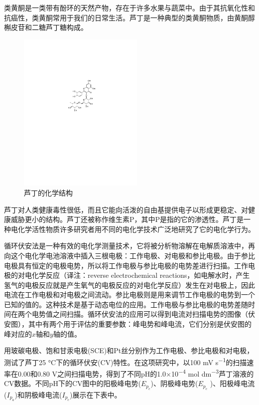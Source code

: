 类黄酮是一类带有酚环的天然产物，存在于许多水果与蔬菜中。由于其抗氧化性和抗癌性，类黄酮常用于我们的日常生活。芦丁是一种典型的类黄酮物质，由黄酮醇槲皮苷和二糖芦丁糖构成。

\begin{figure}[h]
	\centering
	\includegraphics[width=6cm]{./pic/t17-1.pdf}
	\caption*{芦丁的化学结构}
\end{figure}

芦丁对人类健康毒性很低，而且它能向活泼的自由基提供电子以形成更稳定、对健康威胁更小的结构。芦丁还被称作维生素P，其中P是指的它的渗透性。芦丁是一种电化学活性物质许多研究者用不同的电化学技术广泛地研究了它的电化学行为。

循环伏安法是一种有效的电化学测量技术，它将被分析物溶解在电解质溶液中，再向这个电化学电池溶液中插入三根电极：工作电极、对电极和参比电极。由于参比电极具有恒定的电极电势，所以将工作电极与参比电极的电势差进行扫描。工作电极的对电化学反应（译注：reverse electrochemical reactions，如电解水时，产生氢气的电极反应就是产生氧气的电极反应的对电化学反应）发生在对电极上，因此电流在工作电极和对电极之间流动。参比电极则是用来调节工作电极的电势到一个已知的值的。这种技术是基于动态电位的应用。工作电极与参比电极的电势差随时间在两个电势值之间扫描。循环伏安法的应用可以得到电流对扫描电势的图像（伏安图），其中有两个用于评估的重要参数：峰电势和峰电流，它们分别是伏安图的峰对应的$x$轴和$y$轴的值。

用玻碳电极、饱和甘汞电极(SCE)和Pt丝分别作为工作电极、参比电极和对电极，测试了芦丁25 °C下的循环伏安(CV)特性。在这项研究中，以100 mV s\textsuperscript{−1}的扫描速率在0.00和0.80 V之间扫描电势，得到了不同pH的1.0×10\textsuperscript{−4} mol dm\textsuperscript{−3}芦丁溶液的CV数据。不同pH下的CV图中的阳极峰电势($E_{p_c}$)、阴极峰电势($E_{p_c}$ )、阳极峰电流($I_{p_a}$)和阴极峰电流($I_{p_c}$)展示在下表中。


